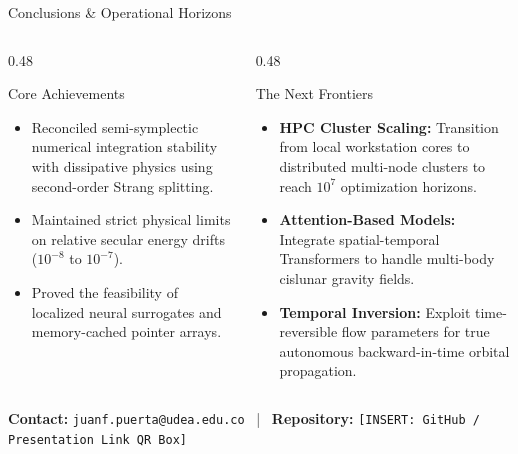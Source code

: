 \documentclass[presentation,10pt,aspectratio=169]{beamer}
\begin{document}
\begin{frame}{Conclusions \& Operational Horizons}
    \begin{columns}[T]
        \begin{column}{0.48\textwidth}
            \begin{block}{Core Achievements}
                \begin{itemize}
                    \item Reconciled semi-symplectic numerical integration stability with dissipative physics using second-order Strang splitting.
                    \item Maintained strict physical limits on relative secular energy drifts ($10^{-8}$ to $10^{-7}$).
                    \item Proved the feasibility of localized neural surrogates and memory-cached pointer arrays.
                \end{itemize}
            \end{block}
        \end{column}
        \begin{column}{0.48\textwidth}
            \begin{exampleblock}{The Next Frontiers}
                \begin{itemize}
                    \item \textbf{HPC Cluster Scaling:} Transition from local workstation cores to distributed multi-node clusters to reach $10^7$ optimization horizons.
                    \item \textbf{Attention-Based Models:} Integrate spatial-temporal Transformers to handle multi-body cislunar gravity fields.
                    \item \textbf{Temporal Inversion:} Exploit time-reversible flow parameters for true autonomous backward-in-time orbital propagation.
                \end{itemize}
            \end{exampleblock}
        \end{column}
    \end{columns}
    \vspace{0.4cm}
    \centering
    \footnotesize \textbf{Contact:} \texttt{juanf.puerta@udea.edu.co} \, | \, \textbf{Repository:} \texttt{[INSERT: GitHub / Presentation Link QR Box]}
\end{frame}
\end{document}

